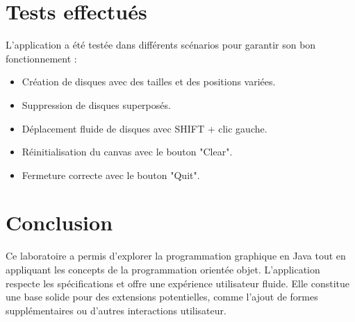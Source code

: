\documentclass[12pt]{report}
\begin{document}
    \section*{Tests effectués}
    L'application a été testée dans différents scénarios pour garantir son bon fonctionnement :
    \begin{itemize}
        \item Création de disques avec des tailles et des positions variées.
        \item Suppression de disques superposés.
        \item Déplacement fluide de disques avec SHIFT + clic gauche.
        \item Réinitialisation du canvas avec le bouton "Clear".
        \item Fermeture correcte avec le bouton "Quit".
    \end{itemize}

    \section*{Conclusion}
    Ce laboratoire a permis d'explorer la programmation graphique en Java tout en appliquant les concepts de la programmation orientée objet.
    L'application respecte les spécifications et offre une expérience utilisateur fluide. Elle constitue une base solide pour des extensions potentielles, comme l'ajout de formes supplémentaires ou d'autres interactions utilisateur.
\end{document}
